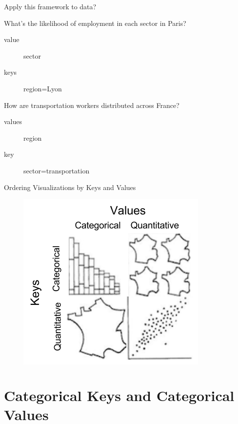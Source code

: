 \documentclass[xcolor={dvipsnames}]{beamer}
\begin{document}
\begin{frame}{Apply this framework to data?}
\begin{block}{What's the likelihood of employment in each sector in Paris?}
    \begin{description}
        \item[value] sector
        \item[keys] region=Lyon
    \end{description}
\end{block}

\pause
\begin{block}{How are transportation workers distributed across France?}
    \begin{description}
        \item[values] region
        \item[key] sector=transportation
    \end{description}
\end{block}
\end{frame}

\begin{frame}{Ordering Visualizations by Keys and Values}
\begin{figure}
\includegraphics[height=.75\textheight]{figs/bertinf.png}
\end{figure}
\end{frame}

\section{Categorical Keys and Categorical Values}
\frame{\sectionpage}
\end{document}
